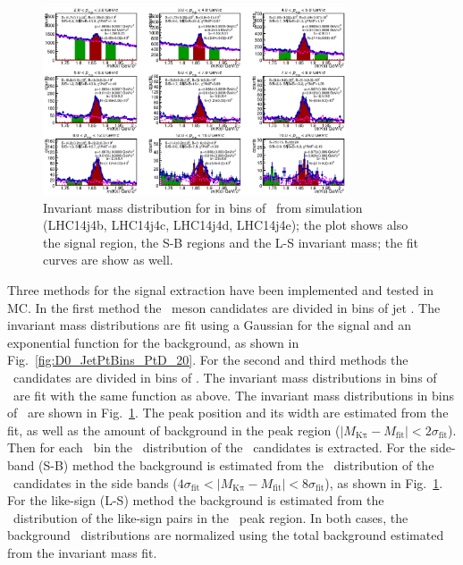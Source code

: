 \begin{figure}[tbh]
\begin{center}
\includegraphics[width=0.8\textwidth]{img/D0_DPtBins_PtD_20}
 \caption{Invariant mass distribution for in bins of \ptd\ from simulation (LHC14j4b, LHC14j4c, LHC14j4d, LHC14j4e); the plot shows also the signal region, the S-B regions and the L-S invariant mass; the fit curves are show as well.} 
 \label{fig:D0_DPtBins_PtD_20}
\end{center}
\end{figure}
Three methods for the signal extraction have been implemented and tested in MC.
In the first method the \Dzero\ meson candidates are divided in bins of jet \pt. The invariant mass distributions
are fit using a Gaussian for the signal and an exponential function for the background, as shown in Fig.~\ref{fig:D0_JetPtBins_PtD_20}.
For the second and third methods the \Dzero\ candidates are divided in bins of \ptd. 
The invariant mass distributions in bins of \ptd\ are fit with the same function as above. The 
invariant mass distributions in bins of \ptd\ are shown in Fig.~\ref{fig:D0_DPtBins_PtD_20}. The
peak position and its width are estimated from the fit, as well as the amount of background 
in the peak region ($|M_{\mathrm{K\pi}}-M_{\mathrm{fit}}| < 2\sigma_{\mathrm{fit}}$).
Then for each \ptd\ bin the \ptchjet\ distribution of the \Dzero\ candidates is extracted.
For the side-band (S-B) method the background is estimated from the \ptchjet\ distribution 
of the \Dzero\ candidates in the side bands (\mbox{$4\sigma_{\mathrm{fit}} < |M_{\mathrm{K\pi}}-M_{\mathrm{fit}}| < 8\sigma_{\mathrm{fit}}$}),
as shown in Fig.~\ref{fig:D0_DPtBins_PtD_20}.
For the like-sign (L-S) method the background is estimated from the \ptchjet\ distribution of the like-sign pairs in the \Dzero\ peak region.
In both cases, the background \ptchjet\ distributions are normalized using the total background estimated from the invariant mass fit.
